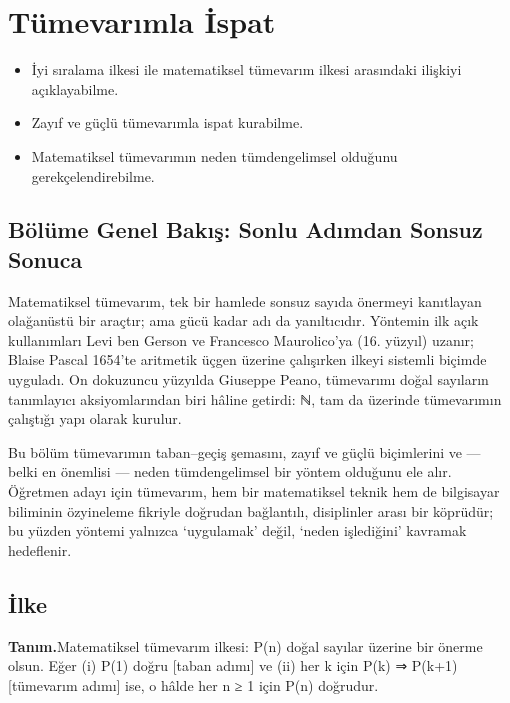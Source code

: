 \chapter{Tümevarımla İspat}
\label{chap:tumevarim}


\par{}\nopagebreak

\begin{itemize}\setlength{\itemsep}{2pt}\setlength{\parskip}{0pt}
\item İyi sıralama ilkesi ile matematiksel tümevarım ilkesi arasındaki ilişkiyi açıklayabilme.
\item Zayıf ve güçlü tümevarımla ispat kurabilme.
\item Matematiksel tümevarımın neden tümdengelimsel olduğunu gerekçelendirebilme.
\end{itemize}

\section*{Bölüme Genel Bakış: Sonlu Adımdan Sonsuz Sonuca}

Matematiksel tümevarım, tek bir hamlede sonsuz sayıda önermeyi kanıtlayan olağanüstü bir araçtır; ama gücü kadar adı da yanıltıcıdır. Yöntemin ilk açık kullanımları Levi ben Gerson ve Francesco Maurolico’ya (16. yüzyıl) uzanır; Blaise Pascal 1654’te aritmetik üçgen üzerine çalışırken ilkeyi sistemli biçimde uyguladı. On dokuzuncu yüzyılda Giuseppe Peano, tümevarımı doğal sayıların tanımlayıcı aksiyomlarından biri hâline getirdi: ℕ, tam da üzerinde tümevarımın çalıştığı yapı olarak kurulur.

Bu bölüm tümevarımın taban–geçiş şemasını, zayıf ve güçlü biçimlerini ve — belki en önemlisi — neden tümdengelimsel bir yöntem olduğunu ele alır. Öğretmen adayı için tümevarım, hem bir matematiksel teknik hem de bilgisayar biliminin özyineleme fikriyle doğrudan bağlantılı, disiplinler arası bir köprüdür; bu yüzden yöntemi yalnızca ‘uygulamak’ değil, ‘neden işlediğini’ kavramak hedeflenir.

\section{İlke}

\begin{tcolorbox}[bookbox,colback=cDef]\textbf{\textsf{\textcolor{cAcc}{Tanım.}}}\quad Matematiksel tümevarım ilkesi: P(n) doğal sayılar üzerine bir önerme olsun. Eğer (i) P(1) doğru [taban adımı] ve (ii) her k için P(k) ⇒ P(k+1) [tümevarım adımı] ise, o hâlde her n ≥ 1 için P(n) doğrudur.\end{tcolorbox}


